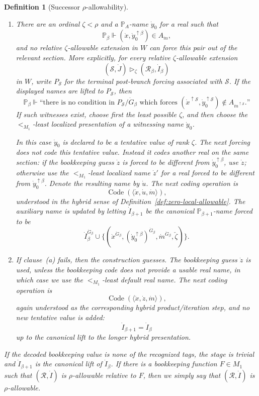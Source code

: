 \documentclass[10pt,a4paper]{amsart}
\newtheorem{definition}{Definition}
\begin{document}
\begin{definition}[Successor \(\rho\)-allowability]
\begin{enumerate}
\item[(a)] There are an ordinal \(\zeta<\rho\) and a \(\mathbb P_A\)-name
\(\dot y_0\) for a real such that
\[
   \mathbb P_\beta\Vdash
   (\dot x,\dot y_0^{\uparrow\beta})\in A_{\dot m},
\]
and no relative \(\zeta\)-allowable extension in \(W\) can force this pair
out of the relevant section.  More explicitly, for every relative
\(\zeta\)-allowable extension
\[
   (\mathcal S,\dot J)\triangleright_\zeta(\mathcal R_\beta,\dot I_\beta)
\]
in \(W\), write \(P_{\mathcal S}\) for the terminal post-branch forcing
associated with \(\mathcal S\).  If the displayed names are lifted to
\(P_{\mathcal S}\), then
\[
   \mathbb P_\beta\Vdash
   \text{``there is no condition in }
   P_{\mathcal S}/\dot G_\beta
   \text{ which forces }
   (\dot x^{\uparrow\mathcal S},\dot y_0^{\uparrow\mathcal S})
      \notin A_{\dot m^{\uparrow\mathcal S}}\text{.''}
\]
If such witnesses exist, choose first the least possible \(\zeta\), and then
choose the \(<_{M_1}\)-least localized presentation of a witnessing name
\(\dot y_0\).

In this case \(\dot y_0\) is declared to be a tentative value of rank
\(\zeta\).  The next forcing does not code this tentative value.  Instead it
codes another real on the same section: if the bookkeeping guess \(\dot z\) is
forced to be different from \(\dot y_0^{\uparrow\beta}\), use \(\dot z\);
otherwise use the \(<_{M_1}\)-least localized name \(\dot z'\) for a real
forced to be different from \(\dot y_0^{\uparrow\beta}\).  Denote the resulting
name by \(\dot u\).  The next coding operation is
\[
   \operatorname{Code}(\langle\dot x,\dot u,\dot m\rangle),
\]
understood in the hybrid sense of Definition~\ref{def:zero-local-allowable}.
The auxiliary name is updated by letting \(\dot I_{\beta+1}\) be the canonical
\(\mathbb P_{\beta+1}\)-name forced to be
\[
   \dot I_\beta^{\dot G_\beta}
   \cup
   \{(\dot x^{\dot G_\beta},
       (\dot y_0^{\uparrow\beta})^{\dot G_\beta},
       \dot m^{\dot G_\beta},\check\zeta)\}.
\]

\item[(b)] If clause~(a) fails, then the construction guesses.  The bookkeeping
guess \(\dot z\) is used, unless the bookkeeping code does not provide a usable
real name, in which case we use the \(<_{M_1}\)-least default real name.  The
next coding operation is
\[
   \operatorname{Code}(\langle\dot x,\dot z,\dot m\rangle),
\]
again understood as the corresponding hybrid product/iteration step, and no
new tentative value is added:
\[
   \dot I_{\beta+1}=\dot I_\beta
\]
up to the canonical lift to the longer hybrid presentation.
\end{enumerate}

If the decoded bookkeeping value is none of the recognized tags, the stage is
trivial and \(\dot I_{\beta+1}\) is the canonical lift of \(\dot I_\beta\).  If
there is a bookkeeping function \(F\in M_1\) such that \((\mathcal R,\dot I)\) is
\(\rho\)-allowable relative to \(F\), then we simply say that
\((\mathcal R,\dot I)\) is \(\rho\)-allowable.
\end{definition}
\end{document}
